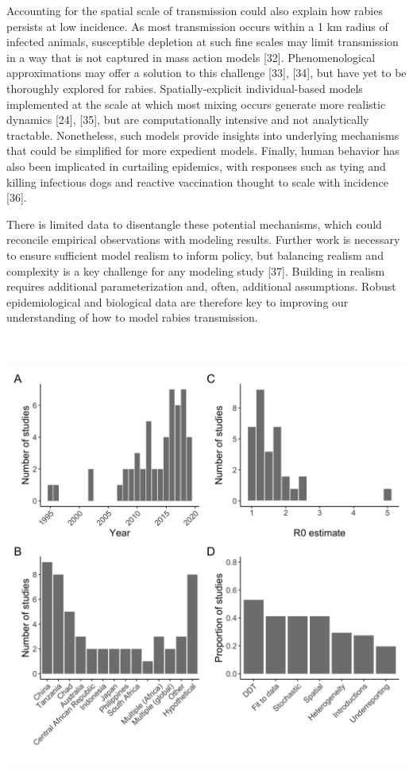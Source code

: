 \documentclass[
]{book}
\begin{document}
Accounting for the spatial scale of transmission could also explain how
rabies persists at low incidence. As most transmission occurs within a 1
km radius of infected animals, susceptible depletion at such fine scales
may limit transmission in a way that is not captured in mass action
models {[}32{]}. Phenomenological approximations may offer a solution to
this challenge {[}33{]}, {[}34{]}, but have yet to be thoroughly explored
for rabies. Spatially-explicit individual-based models implemented at
the scale at which most mixing occurs generate more realistic dynamics
{[}24{]}, {[}35{]}, but are computationally intensive and not analytically
tractable. Nonetheless, such models provide insights into underlying
mechanisms that could be simplified for more expedient models. Finally,
human behavior has also been implicated in curtailing epidemics, with
responses such as tying and killing infectious dogs and reactive
vaccination thought to scale with incidence {[}36{]}.

There is limited data to disentangle these potential mechanisms, which
could reconcile empirical observations with modeling results. Further
work is necessary to ensure sufficient model realism to inform policy,
but balancing realism and complexity is a key challenge for any modeling
study {[}37{]}. Building in realism requires additional parameterization
and, often, additional assumptions. Robust epidemiological and
biological data are therefore key to improving our understanding of how
to model rabies transmission.

\includegraphics[width=6in,height=6in]{figs/ch3/image2.jpeg}
\end{document}
